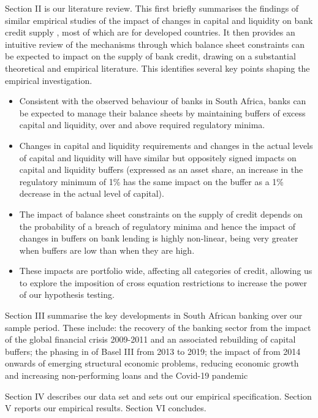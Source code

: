 \documentclass[
]{article}
\begin{document}
Section II is our literature review. This first briefly summarises the findings of similar empirical studies of the impact of changes in capital and liquidity on bank credit supply , most of which are for developed countries. It then provides an intuitive review of the mechanisms through which balance sheet constraints can be expected to impact on the supply of bank credit, drawing on a substantial theoretical and empirical literature. This identifies several key points shaping the empirical investigation.

\begin{itemize}
    \item Consistent with the observed behaviour of banks in South Africa, banks can be expected to manage their balance sheets by maintaining buffers of excess capital and liquidity, over and above required regulatory minima.
    \item Changes in capital and liquidity requirements and changes in the actual levels of capital and liquidity will have similar but oppositely signed impacts on capital and liquidity buffers (expressed as an asset share, an increase in the regulatory minimum of 1\% has the same impact on the buffer as a 1\% decrease in the actual level of capital). 
    \item The impact of balance sheet constraints on the supply of credit depends on the probability of a breach of regulatory minima and hence the impact of changes in buffers on bank lending is highly non-linear, being very greater when buffers are low than when they are high. 
    \item These impacts are portfolio wide, affecting all categories of credit, allowing us to explore the imposition of cross equation restrictions to increase the power of our hypothesis testing.  
\end{itemize}

Section III summarise the key developments in South African banking over our sample period. These include: the recovery of the banking sector from the impact of the global financial crisis 2009-2011 and an associated rebuilding of capital buffers; the phasing in of Basel III from 2013 to 2019; the impact of from 2014 onwards of emerging structural economic problems, reducing economic growth and increasing non-performing loans and the Covid-19 pandemic

Section IV describes our data set and sets out our empirical specification. Section V reports our empirical results. Section VI concludes.
\end{document}
